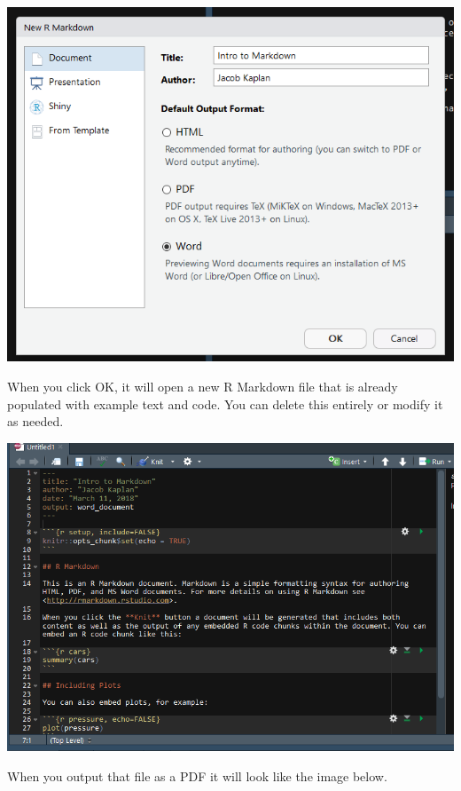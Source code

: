 \documentclass[
  12pt,
]{book}
\begin{document}
\includegraphics{images/markdown2.png}

When you click OK, it will open a new R Markdown file that is already populated with example text and code. You can delete this entirely or modify it as needed.

\includegraphics{images/markdown6.png}

When you output that file as a PDF it will look like the image below.
\end{document}
